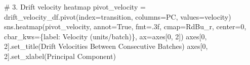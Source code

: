 \documentclass[
  letterpaper,
  DIV=11,
  numbers=noendperiod]{scrartcl}
\newenvironment{Shaded}{\begin{snugshade}}{\end{snugshade}}
\newcommand{\CommentTok}[1]{\textcolor[rgb]{0.37,0.37,0.37}{#1}}
\newcommand{\DecValTok}[1]{\textcolor[rgb]{0.68,0.00,0.00}{#1}}
\newcommand{\NormalTok}[1]{\textcolor[rgb]{0.00,0.23,0.31}{#1}}
\newcommand{\OperatorTok}[1]{\textcolor[rgb]{0.37,0.37,0.37}{#1}}
\newcommand{\StringTok}[1]{\textcolor[rgb]{0.13,0.47,0.30}{#1}}
\newcommand{\VariableTok}[1]{\textcolor[rgb]{0.07,0.07,0.07}{#1}}
\renewenvironment{Shaded}{%
  \begin{tcolorbox}[%
    enhanced,%
    colback=codebg,%
    colframe=codebg,%
    borderline west={3pt}{0pt}{sectionblue},%
    fontupper=\small\ttfamily,%
    boxrule=0pt,%
    arc=0pt,%
    boxsep=5pt,%
    left=2mm,%
    right=2mm,%
    top=2mm,%
    bottom=2mm%
  ]%
}{%
  \end{tcolorbox}%
}
\begin{document}
\begin{Shaded}
\begin{Highlighting}[]
\CommentTok{\# 3. Drift velocity heatmap}
\NormalTok{pivot\_velocity }\OperatorTok{=}\NormalTok{ drift\_velocity\_df.pivot(index}\OperatorTok{=}\StringTok{\textquotesingle{}transition\textquotesingle{}}\NormalTok{, columns}\OperatorTok{=}\StringTok{\textquotesingle{}PC\textquotesingle{}}\NormalTok{, values}\OperatorTok{=}\StringTok{\textquotesingle{}velocity\textquotesingle{}}\NormalTok{)}
\NormalTok{sns.heatmap(pivot\_velocity, annot}\OperatorTok{=}\VariableTok{True}\NormalTok{, fmt}\OperatorTok{=}\StringTok{\textquotesingle{}.3f\textquotesingle{}}\NormalTok{, cmap}\OperatorTok{=}\StringTok{\textquotesingle{}RdBu\_r\textquotesingle{}}\NormalTok{, center}\OperatorTok{=}\DecValTok{0}\NormalTok{,}
\NormalTok{            cbar\_kws}\OperatorTok{=}\NormalTok{\{}\StringTok{\textquotesingle{}label\textquotesingle{}}\NormalTok{: }\StringTok{\textquotesingle{}Velocity (units/batch)\textquotesingle{}}\NormalTok{\}, ax}\OperatorTok{=}\NormalTok{axes[}\DecValTok{0}\NormalTok{, }\DecValTok{2}\NormalTok{])}
\NormalTok{axes[}\DecValTok{0}\NormalTok{, }\DecValTok{2}\NormalTok{].set\_title(}\StringTok{\textquotesingle{}Drift Velocities Between Consecutive Batches\textquotesingle{}}\NormalTok{)}
\NormalTok{axes[}\DecValTok{0}\NormalTok{, }\DecValTok{2}\NormalTok{].set\_xlabel(}\StringTok{\textquotesingle{}Principal Component\textquotesingle{}}\NormalTok{)}


\end{Highlighting}
\end{Shaded}
\end{document}
